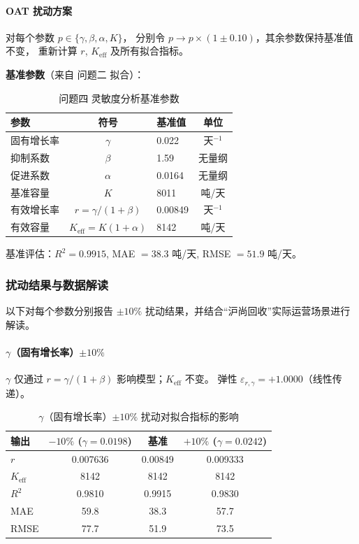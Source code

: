 \documentclass[12pt,a4paper]{ctexart}
\begin{document}
\paragraph{OAT 扰动方案}

对每个参数 $p \in \{\gamma, \beta, \alpha, K\}$，
分别令 $p \to p \times (1 \pm 0.10)$，其余参数保持基准值不变，
重新计算 $r$, $K_{\text{eff}}$ 及所有拟合指标。

\textbf{基准参数}（来自 问题二 拟合）：

\begin{table}[htbp]
\centering
\caption{问题四 灵敏度分析基准参数}
\label{tab:baseline_params}
\begin{tabular}{lclc}
\toprule
参数 & 符号 & 基准值 & 单位 \\
\midrule
固有增长率 & $\gamma$ & 0.022   & 天$^{-1}$ \\
抑制系数   & $\beta$  & 1.59  & 无量纲 \\
促进系数   & $\alpha$ & 0.0164  & 无量纲 \\
基准容量   & $K$      & 8011    & 吨/天 \\
\midrule
有效增长率 & $r = \gamma/(1+\beta)$ & 0.00849 & 天$^{-1}$ \\
有效容量   & $K_{\text{eff}} = K(1+\alpha)$ & 8142 & 吨/天 \\
\bottomrule
\end{tabular}
\end{table}

基准评估：$R^2 = 0.9915$, MAE $= 38.3$ 吨/天, RMSE $= 51.9$ 吨/天。

\subsubsection{扰动结果与数据解读}

以下对每个参数分别报告 $\pm 10\%$ 扰动结果，并结合``沪尚回收''实际运营场景进行解读。

\paragraph{$\gamma$（固有增长率）$\pm 10\%$}

$\gamma$ 仅通过 $r = \gamma/(1+\beta)$ 影响模型；$K_{\text{eff}}$ 不变。
弹性 $\varepsilon_{r,\gamma} = +1.0000$（线性传递）。

\begin{table}[htbp]
\centering
\caption{$\gamma$（固有增长率）$\pm 10\%$ 扰动对拟合指标的影响}
\label{tab:sens_gamma}
\begin{tabular}{lccc}
\toprule
输出 & $-10\%$ ($\gamma = 0.0198$) & 基准 & $+10\%$ ($\gamma = 0.0242$) \\
\midrule
$r$      & 0.007636 & 0.00849 & 0.009333 \\
$K_{\text{eff}}$ & 8142 & 8142 & 8142 \\
$R^2$    & 0.9810 & 0.9915 & 0.9830 \\
MAE      & 59.8 & 38.3 & 57.7 \\
RMSE     & 77.7 & 51.9 & 73.5 \\
\bottomrule
\end{tabular}
\end{table}
\end{document}
